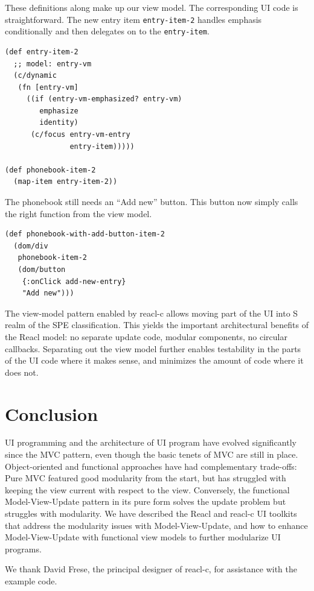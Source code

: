 \documentclass[sigplan,review,screen]{acmart}
\begin{document}
These definitions along make up our view model. The corresponding
UI code is straightforward. The new entry item \texttt{entry-item-2}
handles emphasis conditionally and then delegates on to the
\texttt{entry-item}.
%
\begin{verbatim}
(def entry-item-2
  ;; model: entry-vm
  (c/dynamic
   (fn [entry-vm]
     ((if (entry-vm-emphasized? entry-vm)
        emphasize
        identity)
      (c/focus entry-vm-entry
               entry-item)))))

(def phonebook-item-2
  (map-item entry-item-2))
\end{verbatim}
%
The phonebook still needs an ``Add new'' button. This button
now simply calls the right function from the view model.
%
\begin{verbatim}
(def phonebook-with-add-button-item-2
  (dom/div
   phonebook-item-2
   (dom/button
    {:onClick add-new-entry}
    "Add new")))
\end{verbatim}
%
The view-model pattern enabled by reacl-c allows moving part of the UI
into S realm of the SPE classification.  This yields the important
architectural benefits of the Reacl model: no separate update code,
modular components, no circular callbacks.  Separating out the view
model further enables testability in the parts of the UI code where it
makes sense, and minimizes the amount of code where it does not.

\section{Conclusion}
\label{sec:conclusion}

UI programming and the architecture of UI program have evolved
significantly since the MVC pattern, even though the basic tenets of
MVC are still in place.  Object-oriented and functional approaches
have had complementary trade-offs: Pure MVC featured good modularity
from the start, but has struggled with keeping the view current with
respect to the view.
Conversely, the functional Model-View-Update pattern in its pure form
solves the update problem but struggles with modularity.  We have
described the Reacl and reacl-c UI toolkits that address the
modularity issues with Model-View-Update, and how to enhance
Model-View-Update with functional view models to further modularize UI
programs.

\begin{acks}
  We thank David Frese, the principal designer of reacl-c, for
  assistance with the example code.
\end{acks}



\end{document}
